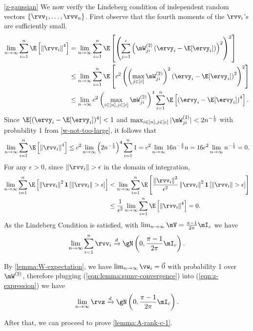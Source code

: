 \begin{proofof}{\cref{z-gaussian}}
We now verify the Lindeberg condition of independent random vectors $\{\rvv_1,\ldots, \rvv_n\}$.
First observe that the fourth moments of the $\rvv_i$'s are sufficiently small.
\begin{equation}
\begin{split}
    \lim_{n\to\infty}\sum_{i=1}^n\E\left[\left\Vert\rvv_i\right\Vert^4\right] &= \lim_{n\to\infty}\sum_{i=1}^n\E\left[\left(\sum_{j=1}^c \left(\mW^{(2)}_{ji}\left(\ervy_i - \E[\ervy_i]\right)\right)^2\right)^2\right]\\
    & \leq\lim_{n\to\infty} \sum_{i=1}^n\E\left[c^2\left(\left(\max_{j\in[c]}\mW^{(2)}_{ji}\right)^2\left(\ervy_i - \E[\ervy_i]\right)^2\right)^2\right]\\
    & \leq\lim_{n\to\infty} c^2\left(\max_{i\in[n],j\in[c]}\mW^{(2)}_{ji}\right)^4\sum_{i=1}^n\E\left[\left(\ervy_i - \E[\ervy_i]\right)^4\right].
\end{split}
\end{equation}
Since $\E[(\ervy_i - \E[\ervy_i])^4] < 1$ and $\max_{i\in[n],j\in[c]}|\mW^{(2)}_{ji}| < 2n^{-\frac13}$ with probability 1 from \cref{w-not-too-large}, it follows that
\begin{equation}
\begin{split}
    \lim_{n\to\infty}\sum_{i=1}^n\E\left[\left\Vert\rvv_i\right\Vert^4\right] \leq c^2\lim_{n\to\infty}\left(2n^{-\frac13}\right)^4\sum_{i=1}^n 1 = c^2 \lim_{n\to\infty}16n^{-\frac43}n =  16c^2 \lim_{n\to\infty}n^{-\frac13} =0.
\end{split}
\end{equation}
For any $\epsilon > 0$, since $\left\Vert\rvv_{i}\right\Vert > \epsilon$ in the domain of integration,
\begin{equation}
\begin{split}
\lim_{n\to\infty}\sum_{i=1}^n\E\left[\left\Vert\rvv_i\right\Vert^2\textbf{1}\left[\left\Vert\rvv_{i}\right\Vert > \epsilon\right]\right] & < \lim_{n\to\infty}\sum_{i=1}^n\E\left[\frac{\left\Vert\rvv_i\right\Vert^2}{\epsilon^2}\left\Vert\rvv_i\right\Vert^2\textbf{1}\left[\left\Vert\rvv_{i}\right\Vert > \epsilon\right]\right]\\
&\leq \frac{1}{\epsilon^2}\lim_{n\to\infty}\sum_{i=1}^n\E\left[\left\Vert\rvv_i\right\Vert^4\right] = 0.
\end{split}
\end{equation}
As the Lindeberg Condition is satisfied, with $\lim_{n\to\infty}\mV = \frac{\pi-1}{2\pi}\mI_c$ we have
\begin{equation}
\label{eqn:lemma:sumv-convergence}
    \lim_{n\to\infty}\sum_{i=1}^n\rvv_i\xrightarrow{d}\gN\left(0,\frac{\pi-1}{2\pi}\mI_c\right).
\end{equation}

By \cref{lemma:W-expectation}, we have $\lim_{n\to\infty}\vw_i = \vec0$ with probability 1 over $\mW^{(2)}$, therefore plugging (\cref{eqn:lemma:sumv-convergence}) into (\cref{eqn:z-expression}) we have\begin{equation}
    \lim_{n\to\infty} \rvz\xrightarrow{d}\gN\left(0,\frac{\pi-1}{2\pi}\mI_c\right).
\end{equation}
\end{proofof}
After that, we can proceed to prove \cref{lemma:A-rank-c-1}.

